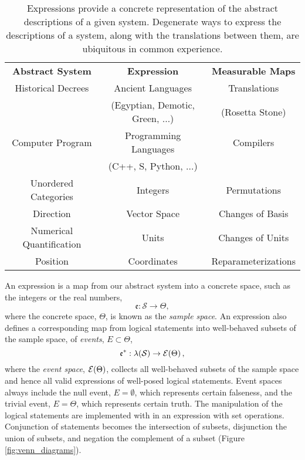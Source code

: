 \begin{table}
  \centering
  \renewcommand{\arraystretch}{1.5}
  \begin{tabular}{ccc}
    \rowcolor[gray]{0.9} 
    \textbf{Abstract System} & \textbf{Expression} & \textbf{Measurable Maps} \\
    Historical Decrees & Ancient Languages & Translations \\
    & (Egyptian, Demotic, Green, $\ldots$) & (Rosetta Stone) \\
    Computer Program & Programming Languages & Compilers \\
    & (C++, S, Python, $\ldots$) & \\
    Unordered Categories & Integers & Permutations \\
    Direction & Vector Space & Changes of Basis \\
    Numerical Quantification & Units & Changes of Units \\
    Position & Coordinates & Reparameterizations \\
  \end{tabular}
\caption{Expressions provide a concrete representation of the abstract
descriptions of a given system.  Degenerate ways to express the 
descriptions of a system, along with the translations between them,
are ubiquitous in common experience.}
\label{tab:expression_examples}
\end{table}

An expression is a map from our abstract system into a concrete space,
such as the integers or the real numbers,
%
\begin{equation*}
\mathfrak{e} : \mathcal{S} \rightarrow \Theta,
\end{equation*}
%
where the concrete space, $\Theta$, is known as the \emph{sample space}.
An expression also defines a corresponding map from logical statements
into well-behaved subsets of the sample space, of \emph{events},
$E \subset \Theta$,
%
\begin{equation*}
\mathfrak{e}^{*} : 
\lambda \! \left( \mathcal{S} \right) \rightarrow  \mathcal{E} \! \left( \Theta \right) ,
\end{equation*}
%
where the \emph{event space}, $ \mathcal{E} \! \left( \Theta \right) $, collects all well-behaved
subsets of the sample space and hence all valid expressions of well-posed 
logical statements. Event spaces always include the null event, $E = \emptyset$, 
which represents certain falseness, and the trivial event, $E = \Theta$, which
represents certain truth.  The manipulation of the logical statements are 
implemented with in an expression with set operations.  Conjunction of 
statements becomes the intersection of subsets, disjunction the union of 
subsets, and negation the complement of a subset (Figure \ref{fig:venn_diagrams}).

